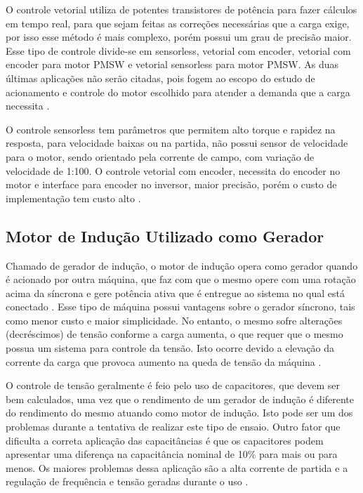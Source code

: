 				O controle vetorial utiliza de potentes transistores de potência para fazer cálculos em tempo real, para que sejam feitas as correções necessárias que a carga exige, por isso esse método é mais complexo, porém possui um grau de precisão maior. Esse tipo de controle divide-se em sensorless, vetorial com encoder, vetorial com encoder para motor PMSW e vetorial sensorless para motor PMSW. As duas últimas aplicações não serão citadas, pois fogem ao escopo do estudo de acionamento e controle do motor escolhido para atender a demanda que a carga necessita \cite{WEGIF}.
				
				O controle sensorless tem parâmetros que permitem alto torque e rapidez na resposta, para velocidade baixas ou na partida, não possui sensor de velocidade para o motor, sendo orientado pela corrente de campo, com variação de velocidade de 1:100. O controle vetorial com encoder, necessita do encoder no motor e interface para encoder no inversor, maior precisão, porém o custo de implementação tem custo alto \cite{WEGIF}.


		\subsection{Motor de Indução Utilizado como Gerador}

			Chamado de gerador de indução, o motor de indução opera como gerador quando é acionado por outra máquina, que faz com que o mesmo opere com uma rotação acima da síncrona e gere potência ativa que é entregue ao sistema no qual está conectado \cite{Medeiros05}. Esse tipo de máquina possui vantagens sobre o gerador síncrono, tais como menor custo e maior simplicidade. No entanto, o mesmo sofre alterações (decréscimos) de tensão conforme a carga aumenta, o que requer que o mesmo possua um sistema para controle da tensão. Isto ocorre devido a elevação da corrente da carga que provoca aumento na queda de tensão da máquina \cite{Medeiros05}.
			
			O controle de tensão geralmente é feio pelo uso de capacitores, que devem ser bem calculados, uma vez que o rendimento de um gerador de indução é diferente do rendimento do mesmo atuando como motor de indução. Isto pode ser um dos problemas durante a tentativa de realizar este tipo de ensaio. Outro fator que dificulta a correta aplicação das capacitâncias é que os capacitores podem apresentar uma diferença na capacitância nominal de 10\% para mais ou para menos. Os maiores problemas dessa aplicação são a alta corrente de partida e a regulação de frequência e tensão geradas durante o uso \cite{Monteiro}.
	 	
